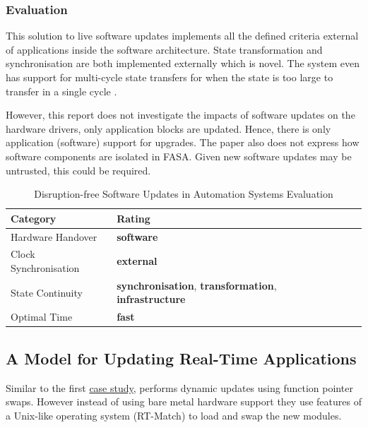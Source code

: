 \subsubsection{Evaluation}
This solution to live software updates implements all the defined criteria external of applications inside the software architecture. State transformation and synchronisation are both implemented externally which is novel. The system even has support for multi-cycle state transfers for when the state is too large to transfer in a single cycle \autocite{wahlerDisruptionfreeSoftwareUpdates2014}.

However, this report does not investigate the impacts of software updates on the hardware drivers, only application blocks are updated. Hence, there is only application (software) support for upgrades. The paper also does not express how software components are isolated in FASA. Given new software updates may be untrusted, this could be required.


\begin{table}[ht]
    \centering
    \begin{tabular}{lll}
    Category & Rating \\ \hline
    Hardware Handover & \textbf{software} \\
    Clock Synchronisation & \textbf{external} \\
    State Continuity & \textbf{synchronisation}, \textbf{transformation}, \textbf{infrastructure} \\
    Optimal Time & \textbf{fast}
    \end{tabular}
    \caption[Disruption-free Software Updates in Automation Systems Evaluation]
    {Disruption-free Software Updates in Automation Systems Evaluation}
    \label{tbl:wahlerDisruptionfreeSoftwareUpdates2014Evaluation}
\end{table}

\clearpage

\subsection{A Model for Updating Real-Time Applications} \label{caseStudy4}
Similar to the first \hyperref[caseStudy1]{case study}, \textcite{montgomeryModelUpdatingRealTime2004} performs dynamic updates using function pointer swaps. However instead of using bare metal hardware support they use features of a Unix-like operating system (RT-Match) to load and swap the new modules.

